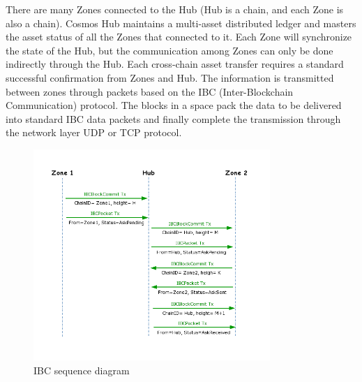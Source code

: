 \noindent There are many Zones connected to the Hub (Hub is a chain, and each Zone is also a chain). Cosmos Hub maintains a multi-asset distributed ledger and masters the asset status of all the Zones that connected to it. Each Zone will synchronize the state of the Hub, but the communication among Zones can only be done indirectly through the Hub. Each cross-chain asset transfer requires a standard successful confirmation from Zones and Hub. 
\noindent The information is transmitted between zones through packets based on the IBC (Inter-Blockchain Communication) protocol. The blocks in a space pack the data to be delivered into standard IBC data packets and finally complete the transmission through the network layer UDP or TCP protocol.
        \begin{figure}[H]
        \includegraphics[width=0.8\textwidth]{./figures/IBC.png}
        \centering
        \caption{IBC sequence diagram}%
        \centering
        \label{fig:IBC}
        \end{figure}
